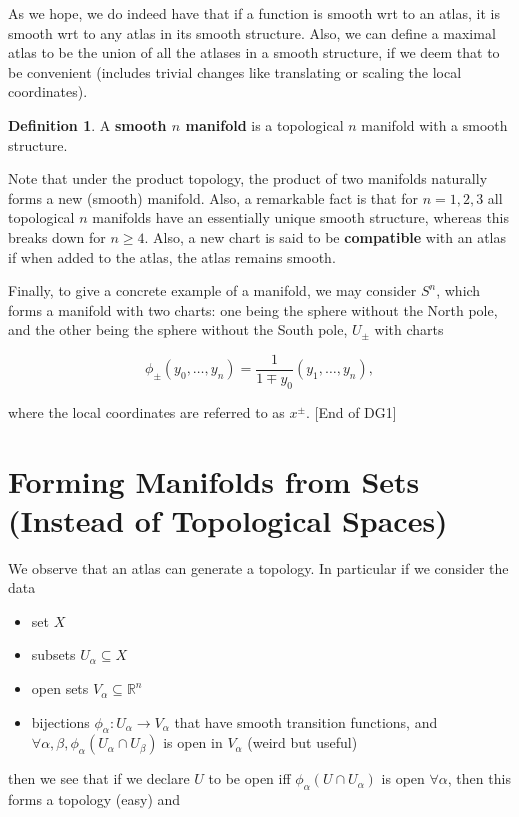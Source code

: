 \documentclass{article}
\theoremstyle{definition}
\newtheorem{definition}{Definition}
\begin{document}
As we hope, we do indeed have that if a function is smooth wrt to an atlas, it
is smooth wrt to any atlas in its smooth structure. Also, we can define a
maximal atlas to be the union of all the atlases in a smooth structure, if we
deem that to be convenient (includes trivial changes like translating or scaling
the local coordinates).

\begin{definition}
  A \textbf{smooth $n$ manifold} is a topological $n$ manifold with a smooth
  structure.
\end{definition}

Note that under the product topology, the product of two manifolds naturally
forms a new (smooth) manifold. Also, a remarkable fact is that for $n=1, 2, 3$
all topological $n$ manifolds have an essentially unique smooth structure,
whereas this breaks down for $n \geq 4$. Also, a new chart is said to be
\textbf{compatible} with an atlas if when added to the atlas, the atlas remains
smooth.

Finally, to give a concrete example of a manifold, we may consider $S^n$, which
forms a manifold with two charts: one being the sphere without the North pole,
and the other being the sphere without the South pole, $U_\pm$ with charts

$$ \phi_\pm(y_0, \dots, y_n) = \frac{1}{1 \mp y_0} (y_1, \dots, y_n), $$

where the local coordinates are referred to as $x^\pm$. [End of DG1]

\section{Forming Manifolds from Sets (Instead of Topological Spaces)}

We observe that an atlas can generate a topology. In particular if we consider
the data

\begin{itemize}
\item set $X$
\item subsets $U_\alpha \subseteq X$
\item open sets $V_\alpha \subseteq \mathbb{R}^n$
\item bijections $\phi_\alpha : U_\alpha \to V_\alpha$ that have smooth
  transition functions, and $\forall \alpha, \beta, \phi_\alpha(U_\alpha \cap
  U_\beta)$ is open in $V_\alpha$ (weird but useful)
\end{itemize}

then we see that if we declare $U$ to be open iff $\phi_\alpha(U \cap U_\alpha)$
is open $\forall \alpha$, then this forms a topology (easy) and 
\end{document}
